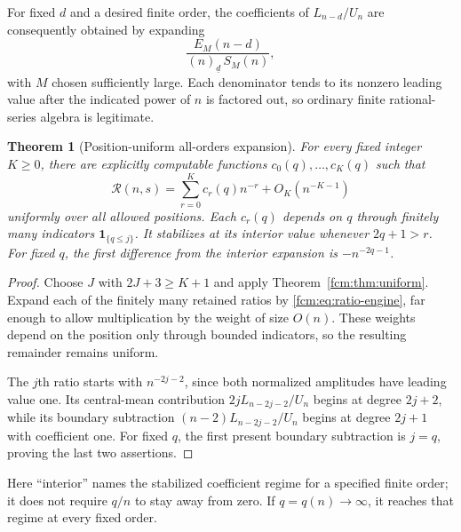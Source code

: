 \documentclass[11pt,letterpaper]{article}
\newtheorem{theorem}{Theorem}[section]
\theoremstyle{remark}\newtheorem{remark}[theorem]{Remark}
\newcommand{\fall}[2]{(#1)_{\underline{#2}}}
\newcommand{\ind}{\mathbf 1}
\newcommand{\RR}{\mathcal R}
\begin{document}
For fixed $d$ and a desired finite order, the coefficients of $L_{n-d}/U_n$ are consequently obtained by expanding
\begin{equation}\label{fcm:eq:ratio-engine}
 \frac{E_M(n-d)}{\fall nd\,S_M(n)},
\end{equation}
with $M$ chosen sufficiently large. Each denominator tends to its nonzero leading value after the indicated power of $n$ is factored out, so ordinary finite rational-series algebra is legitimate.

\begin{theorem}[Position-uniform all-orders expansion]\label{fcm:thm:allorders}
For every fixed integer $K\ge0$, there are explicitly computable functions $c_0(q),\ldots,c_K(q)$ such that
\begin{equation}\label{fcm:eq:allorders}
 \RR(n,s)=\sum_{r=0}^K c_r(q)n^{-r}+O_K(n^{-K-1})
\end{equation}
uniformly over all allowed positions. Each $c_r(q)$ depends on $q$ through finitely many indicators $\ind_{\{q\le j\}}$. It stabilizes at its interior value whenever $2q+1>r$. For fixed $q$, the first difference from the interior expansion is $-n^{-2q-1}$.
\end{theorem}
\begin{proof}
Choose $J$ with $2J+3\ge K+1$ and apply Theorem~\ref{fcm:thm:uniform}. Expand each of the finitely many retained ratios by \eqref{fcm:eq:ratio-engine}, far enough to allow multiplication by the weight of size $O(n)$. These weights depend on the position only through bounded indicators, so the resulting remainder remains uniform.

The $j$th ratio starts with $n^{-2j-2}$, since both normalized amplitudes have leading value one. Its central-mean contribution $2jL_{n-2j-2}/U_n$ begins at degree $2j+2$, while its boundary subtraction $(n-2)L_{n-2j-2}/U_n$ begins at degree $2j+1$ with coefficient one. For fixed $q$, the first present boundary subtraction is $j=q$, proving the last two assertions.
\end{proof}
Here ``interior'' names the stabilized coefficient regime for a specified finite order; it does not require $q/n$ to stay away from zero. If $q=q(n)\to\infty$, it reaches that regime at every fixed order.
\end{document}
